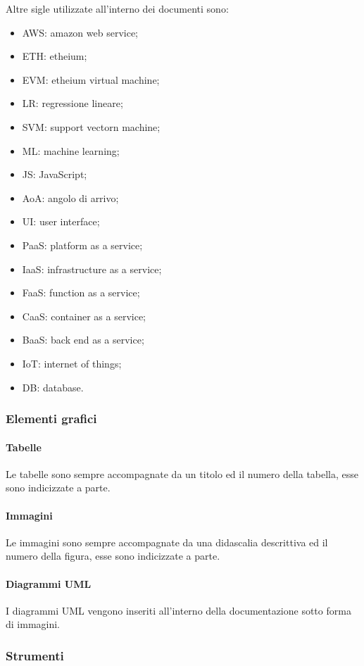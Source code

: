 				Altre sigle utilizzate all'interno dei documenti sono:
				\begin{itemize}
					\item AWS: amazon web service;
					\item ETH: etheium;
					\item EVM: etheium virtual machine;
					\item LR: regressione lineare;
					\item SVM: support vectorn machine;
					\item ML: machine learning;
					\item JS: JavaScript;
					\item AoA: angolo di arrivo;
					\item UI: user interface;
					\item PaaS: platform as a service;
					\item IaaS: infrastructure as a service;
					\item FaaS: function as a service;
					\item CaaS: container as a service;
					\item BaaS: back end as a service;
					\item IoT: internet of things;
					\item DB: database.
				\end{itemize}

		\subsubsection{Elementi grafici}
			\paragraph{Tabelle}
				Le tabelle sono sempre accompagnate da un titolo ed il numero della tabella, esse sono indicizzate a parte.
			\paragraph{Immagini}
				Le immagini sono sempre accompagnate da una didascalia descrittiva ed il numero della figura, esse sono indicizzate a parte.
			\paragraph{Diagrammi UML}
				I diagrammi UML vengono inseriti all'interno della documentazione sotto forma di immagini.
		\subsubsection{Strumenti}
